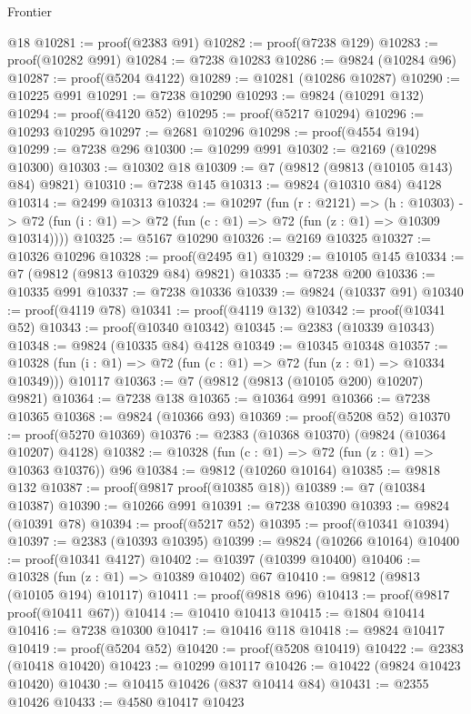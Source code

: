\begin{lexlean}{Frontier}
\begin{coremodule}
    @18
@10281 := proof(@2383 @91)
@10282 := proof(@7238 @129)
@10283 := proof(@10282 @991)
@10284 := @7238 @10283
@10286 := @9824 (@10284 @96)
@10287 := proof(@5204 @4122)
@10289 := @10281 (@10286 @10287)
@10290 := @10225 @991
@10291 := @7238 @10290
@10293 := @9824 (@10291 @132)
@10294 := proof(@4120 @52)
@10295 := proof(@5217 @10294)
@10296 := @10293 @10295
@10297 := @2681 @10296
@10298 := proof(@4554 @194)
@10299 := @7238 @296
@10300 := @10299 @991
@10302 := @2169 (@10298 @10300)
@10303 := @10302 @18
@10309 := @7 (@9812 (@9813 (@10105 @143) @84) @9821)
@10310 := @7238 @145
@10313 := @9824 (@10310 @84) @4128
@10314 := @2499 @10313
@10324 := @10297
    (fun (r : @2121) =>
    (h : @10303) -> @72 (fun (i : @1) => @72 (fun (c : @1) => @72 (fun (z : @1) => @10309 @10314))))
@10325 := @5167 @10290
@10326 := @2169 @10325
@10327 := @10326 @10296
@10328 := proof(@2495 @1)
@10329 := @10105 @145
@10334 := @7 (@9812 (@9813 @10329 @84) @9821)
@10335 := @7238 @200
@10336 := @10335 @991
@10337 := @7238 @10336
@10339 := @9824 (@10337 @91)
@10340 := proof(@4119 @78)
@10341 := proof(@4119 @132)
@10342 := proof(@10341 @52)
@10343 := proof(@10340 @10342)
@10345 := @2383 (@10339 @10343)
@10348 := @9824 (@10335 @84) @4128
@10349 := @10345 @10348
@10357 := @10328 (fun (i : @1) => @72 (fun (c : @1) => @72 (fun (z : @1) => @10334 @10349))) @10117
@10363 := @7 (@9812 (@9813 (@10105 @200) @10207) @9821)
@10364 := @7238 @138
@10365 := @10364 @991
@10366 := @7238 @10365
@10368 := @9824 (@10366 @93)
@10369 := proof(@5208 @52)
@10370 := proof(@5270 @10369)
@10376 := @2383 (@10368 @10370) (@9824 (@10364 @10207) @4128)
@10382 := @10328 (fun (c : @1) => @72 (fun (z : @1) => @10363 @10376)) @96
@10384 := @9812 (@10260 @10164)
@10385 := @9818 @132
@10387 := proof(@9817 proof(@10385 @18))
@10389 := @7 (@10384 @10387)
@10390 := @10266 @991
@10391 := @7238 @10390
@10393 := @9824 (@10391 @78)
@10394 := proof(@5217 @52)
@10395 := proof(@10341 @10394)
@10397 := @2383 (@10393 @10395)
@10399 := @9824 (@10266 @10164)
@10400 := proof(@10341 @4127)
@10402 := @10397 (@10399 @10400)
@10406 := @10328 (fun (z : @1) => @10389 @10402) @67
@10410 := @9812 (@9813 (@10105 @194) @10117)
@10411 := proof(@9818 @96)
@10413 := proof(@9817 proof(@10411 @67))
@10414 := @10410 @10413
@10415 := @1804 @10414
@10416 := @7238 @10300
@10417 := @10416 @118
@10418 := @9824 @10417
@10419 := proof(@5204 @52)
@10420 := proof(@5208 @10419)
@10422 := @2383 (@10418 @10420)
@10423 := @10299 @10117
@10426 := @10422 (@9824 @10423 @10420)
@10430 := @10415 @10426 (@837 @10414 @84)
@10431 := @2355 @10426
@10433 := @4580 @10417 @10423

\end{coremodule}
\end{lexlean}
